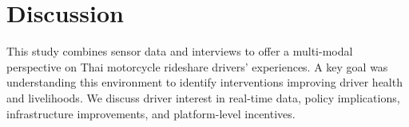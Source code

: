 \section{Discussion}

This study combines sensor data and interviews to offer a multi-modal perspective on Thai motorcycle rideshare drivers' experiences.
A key goal was understanding this environment to identify interventions improving driver health and livelihoods.
We discuss driver interest in real-time data, policy implications, infrastructure improvements, and platform-level incentives.





